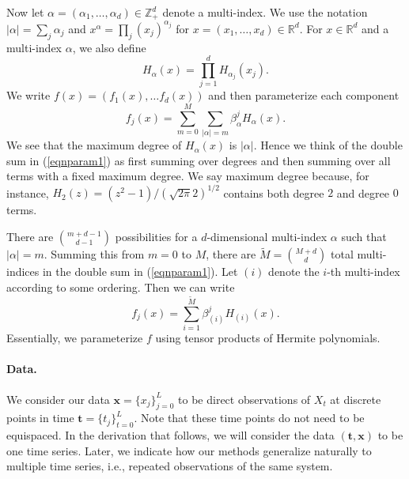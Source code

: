 \documentclass{article}
\newcommand{\bx}{\ensuremath{\mathbf{x}}}
\newcommand{\bt}{\ensuremath{\mathbf{t}}}
\begin{document}
Now let $\alpha = (\alpha_1, \ldots, \alpha_d) \in \mathbb{Z}^d_+$ denote a multi-index.  We use the notation $|\alpha| = \sum_j \alpha_j$ and $x^\alpha = \prod_j (x_j)^{\alpha_j}$ for $x = (x_1, \ldots, x_d) \in \mathbb{R}^d$.  For $x \in \mathbb{R}^d$ and a multi-index $\alpha$, we also define
\begin{equation}
\label{eqnhermmultiindex}
H_\alpha(x) = \prod_{j=1}^d H_{\alpha_j}(x_j).
\end{equation}
We write $f(x) = (f_1(x), \ldots f_d(x))$ and then parameterize each component
\begin{equation}
\label{eqnparam1}
f_j(x) = \sum_{m=0}^M \sum_{|\alpha|=m} \beta^j_\alpha H_\alpha(x).
\end{equation}
We see that the maximum degree of $H_\alpha(x)$ is $|\alpha|$.  Hence we think of the double sum in (\ref{eqnparam1}) as first summing over degrees and then summing over all terms with a fixed maximum degree.  We say maximum degree because, for instance, $H_2(z) = (z^2-1)/(\sqrt{2 \pi} 2)^{1/2}$ contains both degree $2$ and degree $0$ terms.

There are $\binom{m + d - 1}{d-1}$ possibilities for a $d$-dimensional multi-index $\alpha$ such that $|\alpha| = m$.  Summing this from $m=0$ to $M$, there are $\widetilde{M} = \binom{M+d}{d}$ total multi-indices in the double sum in (\ref{eqnparam1}).  Let $(i)$ denote the $i$-th multi-index according to some ordering.  Then we can write
\begin{equation}
\label{eqnparam2}
f_j(x) = \sum_{i=1}^{\widetilde{M}} \beta^j_{(i)} H_{(i)}(x).
\end{equation}
Essentially, we parameterize $f$ using tensor products of Hermite polynomials.

\paragraph{Data.} We consider our data $\bx = \{x_j\}_{j=0}^L$ to be direct observations of $X_t$ at discrete points in time $\bt = \{t_j\}_{t=0}^L$.  Note that these time points do not need to be equispaced.  In the derivation that follows, we will consider the data $(\bt, \bx)$ to be one time series.  Later, we indicate how our methods generalize naturally to multiple time series, i.e., repeated observations of the same system.
\end{document}
